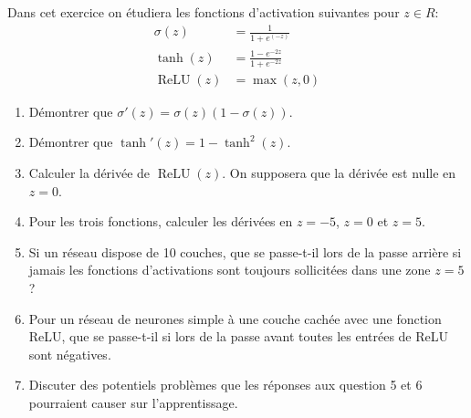 \documentclass[]{../exercices}
\begin{document}
	\begin{exercice}
		Dans cet exercice on étudiera les fonctions d'activation suivantes pour $z \in R$:
		\begin{equation*}
			\begin{aligned}
				\sigma(z) &= \frac{1}{1 + e^{(-z)}} \\
				\tanh(z) &= \frac{1 - e^{-2 z}}{1 + e^{- 2 z}} \\
				\operatorname{ReLU}(z) &= \max{(z, 0)}
			\end{aligned}
		\end{equation*}
		
		\begin{enumerate}
			\item Démontrer que $\sigma'(z) = \sigma(z) \left(1 - \sigma(z)\right)$.
			\item Démontrer que $\tanh'(z) = 1 - \tanh^2(z)$.
			\item Calculer la dérivée de $\operatorname{ReLU}(z)$. On supposera que la dérivée est nulle en $z = 0$.
			\item Pour les trois fonctions, calculer les dérivées en $z=-5$, $z=0$ et $z=5$.
			\item Si un réseau dispose de 10 couches, que se passe-t-il lors de la passe arrière si jamais les fonctions d'activations sont toujours sollicitées dans une zone $z=5$ ?
			\item Pour un réseau de neurones simple à une couche cachée avec une fonction ReLU, que se passe-t-il si lors de la passe avant toutes les entrées de ReLU sont négatives.
			\item Discuter des potentiels problèmes que les réponses aux question 5 et 6 pourraient causer sur l'apprentissage.
		\end{enumerate}
		
	\end{exercice}
\end{document}
